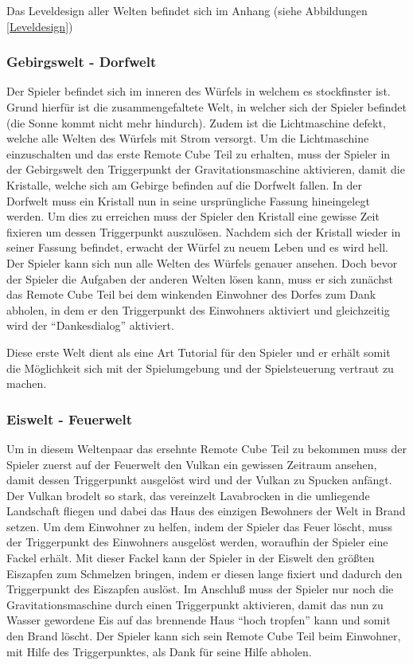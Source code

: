 
Das Leveldesign aller Welten befindet sich im Anhang (siehe Abbildungen \ref{Leveldesign})
\subsubsection{Gebirgswelt - Dorfwelt}
Der Spieler befindet sich im inneren des Würfels in welchem es stockfinster ist. Grund hierfür ist die zusammengefaltete Welt, in welcher sich der Spieler befindet (die Sonne kommt nicht mehr hindurch). Zudem ist die Lichtmaschine defekt, welche alle Welten des Würfels mit Strom versorgt. Um die Lichtmaschine einzuschalten und das erste Remote Cube Teil zu erhalten, muss der Spieler in der Gebirgswelt den Triggerpunkt der Gravitationsmaschine aktivieren, damit die Kristalle, welche sich am Gebirge befinden auf die Dorfwelt fallen. In der Dorfwelt muss ein Kristall nun in seine ursprüngliche Fassung hineingelegt werden. Um dies zu erreichen muss der Spieler den Kristall eine gewisse Zeit fixieren um dessen Triggerpunkt auszulösen. Nachdem sich der Kristall wieder in seiner Fassung befindet, erwacht der Würfel zu neuem Leben und es wird hell. Der Spieler kann sich nun alle Welten des Würfels genauer ansehen. Doch bevor der Spieler die Aufgaben der anderen Welten lösen kann, muss er sich zunächst das Remote Cube Teil bei dem winkenden Einwohner des Dorfes zum Dank abholen, in dem er den Triggerpunkt des Einwohners aktiviert und gleichzeitig wird der \enquote{Dankesdialog} aktiviert.


Diese erste Welt dient als eine Art Tutorial für den Spieler und er erhält somit die Möglichkeit sich mit der Spielumgebung und der Spielsteuerung vertraut zu machen.

\subsubsection{Eiswelt - Feuerwelt}
Um in diesem Weltenpaar das ersehnte Remote Cube Teil zu bekommen muss der Spieler zuerst auf der Feuerwelt den Vulkan ein gewissen Zeitraum ansehen, damit dessen Triggerpunkt ausgelöst wird und der Vulkan zu Spucken anfängt. Der Vulkan brodelt so stark, das vereinzelt Lavabrocken in die umliegende Landschaft fliegen und dabei das Haus des einzigen Bewohners der Welt in Brand setzen. Um dem Einwohner zu helfen, indem der Spieler das Feuer löscht, muss der Triggerpunkt des Einwohners ausgelöst werden, woraufhin der Spieler eine Fackel erhält. Mit dieser Fackel kann der Spieler in der Eiswelt den größten Eiszapfen zum Schmelzen bringen, indem er diesen lange fixiert und dadurch den Triggerpunkt des Eiszapfen auslöst. Im Anschluß muss der Spieler nur noch die Gravitationsmaschine durch einen Triggerpunkt aktivieren, damit das nun zu Wasser gewordene Eis auf das brennende Haus \enquote{hoch tropfen} kann und somit den Brand löscht. Der Spieler kann sich sein Remote Cube Teil beim Einwohner, mit Hilfe des Triggerpunktes, als Dank für seine Hilfe abholen.

